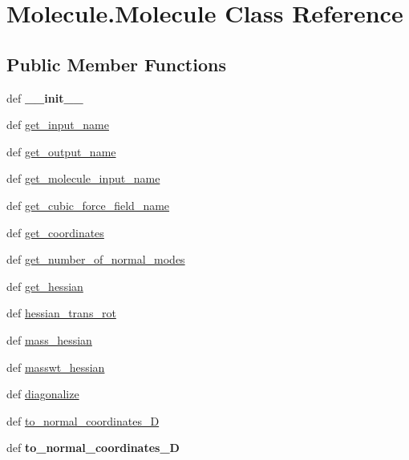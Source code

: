 \hypertarget{classMolecule_1_1Molecule}{\section{Molecule.\+Molecule Class Reference}
\label{classMolecule_1_1Molecule}
}
\subsection*{Public Member Functions}
\begin{DoxyCompactItemize}
\item 
\hypertarget{classMolecule_1_1Molecule_ac0ae55d23c730c26778fcfcc8e6cf143}{def {\bfseries \+\_\+\+\_\+init\+\_\+\+\_\+}}\label{classMolecule_1_1Molecule_ac0ae55d23c730c26778fcfcc8e6cf143}

\item 
def \hyperlink{classMolecule_1_1Molecule_a1ca29d097bb318928b097b1d7564346c}{get\+\_\+input\+\_\+name}
\item 
def \hyperlink{classMolecule_1_1Molecule_ad58fc49bdf93f6091533da4379a4bd86}{get\+\_\+output\+\_\+name}
\item 
def \hyperlink{classMolecule_1_1Molecule_ae6361f06aa090068ac2a51ccaf111a83}{get\+\_\+molecule\+\_\+input\+\_\+name}
\item 
def \hyperlink{classMolecule_1_1Molecule_a6a7ff9badbfe13eebd8047534bc049e6}{get\+\_\+cubic\+\_\+force\+\_\+field\+\_\+name}
\item 
def \hyperlink{classMolecule_1_1Molecule_aee1fe2aec71cb23b0dee8d8c0a07fbab}{get\+\_\+coordinates}
\item 
def \hyperlink{classMolecule_1_1Molecule_aa6c7a0fcbad7e948ab641ef01bfb6cff}{get\+\_\+number\+\_\+of\+\_\+normal\+\_\+modes}
\item 
def \hyperlink{classMolecule_1_1Molecule_a83e5685046b943d85007f3927fa6f45a}{get\+\_\+hessian}
\item 
def \hyperlink{classMolecule_1_1Molecule_a09c7bf3049234e8d4ecfffd0fbd5abc0}{hessian\+\_\+trans\+\_\+rot}
\item 
def \hyperlink{classMolecule_1_1Molecule_ac1ba969132f7988a5c03662d76d57235}{mass\+\_\+hessian}
\item 
def \hyperlink{classMolecule_1_1Molecule_a1d7291d2fd3f839f97507ad6c5acccbd}{masswt\+\_\+hessian}
\item 
def \hyperlink{classMolecule_1_1Molecule_a73503fd04984fa483a54032a919c4426}{diagonalize}
\item 
def \hyperlink{classMolecule_1_1Molecule_a121643aff37481b5182345ef95bc22b2}{to\+\_\+normal\+\_\+coordinates\+\_\+D}
\item 
\hypertarget{classMolecule_1_1Molecule_a6657066ee4dd2db2762ef9f05b7b2cf0}{def {\bfseries to\+\_\+normal\+\_\+coordinates\+\_\+D}}\label{classMolecule_1_1Molecule_a6657066ee4dd2db2762ef9f05b7b2cf0}


\end{DoxyCompactItemize}
